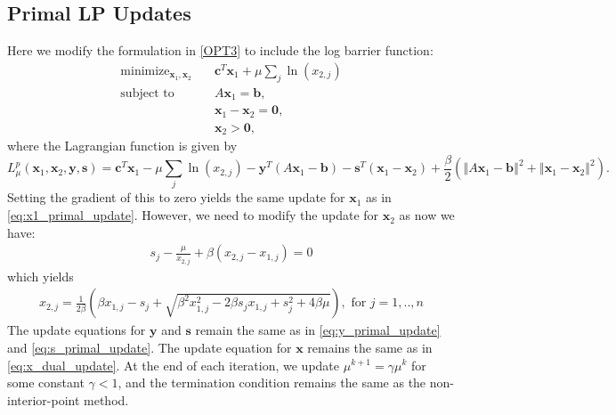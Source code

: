 \documentclass{article}
\begin{document}
\vspace{0.1in}
\subsection*{Primal LP Updates}
Here we modify the formulation in \eqref{OPT3} to include the log barrier function:
\begin{align}
\text{minimize}_{ \mathbf{x}_{1}, \mathbf{x}_{2}} &\quad \mathbf{c}^T\mathbf{x}_1 + \mu \sum_j \ln( {x}_{2,j} )\tag{OPT5}\label{OPT5} \\
\text{subject to  \ \  } &\quad  A \mathbf{x}_{1} = \mathbf{b},  \nonumber \\
&\quad \mathbf{x}_{1}  - \mathbf{x}_{2} = \mathbf{0}, \nonumber \\
&\quad \mathbf{x}_{2} > \mathbf{0}, \nonumber 
\end{align}
where the Lagrangian function is given by
\[
L_{\mu}^{p}(\mathbf{x}_{1},\mathbf{x}_{2},\mathbf{y}, \mathbf{s})=\mathbf{c}^{T}\mathbf{x}_{1}-\mu\sum_{j}\ln\left(x_{2,j}\right)-\mathbf{y}^{T}\left(A\mathbf{x}_{1}-\mathbf{b}\right)-\mathbf{s}^{T}\left(\mathbf{x}_{1}-\mathbf{x}_{2}\right)+\frac{\beta}{2}\left(\left\Vert A\mathbf{x}_{1}-\mathbf{b}\right\Vert ^{2}+\left\Vert \mathbf{x}_{1}-\mathbf{x}_{2}\right\Vert ^{2}\right).
\]
Setting the gradient of this to zero yields the same update for $\mathbf{x}_1$ as in \eqref{eq:x1_primal_update}.
However, we need to modify the update for $\mathbf{x}_2$ as now we have:
\begin{align}
s_j - \frac{\mu}{x_{2,j}} + \beta(x_{2,j} - x_{1,j}) = 0
\end{align}
which yields 
\begin{align}
x_{2,j} = \frac{1}{2\beta}\left(\beta x_{1,j} - s_j  + \sqrt{\beta^2 x_{1,j}^2 - 2\beta s_j x_{1,j} + s_j^2 + 4\beta\mu } \right), \text{ for $j = 1,..,n$}
\end{align}
The update equations for $\mathbf{y}$ and $\mathbf{s}$ remain the same as in \eqref{eq:y_primal_update} and \eqref{eq:s_primal_update}. 
The update equation for $\mathbf{x}$ remains the same as in \eqref{eq:x_dual_update}. At the end of each iteration, we update $\mu^{k+1} = \gamma \mu^k$ for some constant $\gamma<1$, and the termination condition remains the same as the non-interior-point method. 

\vspace{0.1in}
\end{document}
